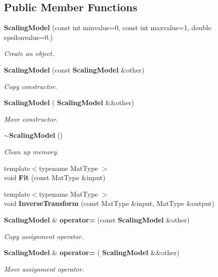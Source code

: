 \subsection*{Public Member Functions}
\begin{DoxyCompactItemize}
\item 
\textbf{ Scaling\+Model} (const int minvalue=0, const int maxvalue=1, double epsilonvalue=0.)
\begin{DoxyCompactList}\small\item\em Create an object. \end{DoxyCompactList}\item 
\textbf{ Scaling\+Model} (const \textbf{ Scaling\+Model} \&other)
\begin{DoxyCompactList}\small\item\em Copy constructor. \end{DoxyCompactList}\item 
\textbf{ Scaling\+Model} (\textbf{ Scaling\+Model} \&\&other)
\begin{DoxyCompactList}\small\item\em Move constructor. \end{DoxyCompactList}\item 
\textbf{ $\sim$\+Scaling\+Model} ()
\begin{DoxyCompactList}\small\item\em Clean up memory. \end{DoxyCompactList}\item 
{\footnotesize template$<$typename Mat\+Type $>$ }\\void \textbf{ Fit} (const Mat\+Type \&input)
\item 
{\footnotesize template$<$typename Mat\+Type $>$ }\\void \textbf{ Inverse\+Transform} (const Mat\+Type \&input, Mat\+Type \&output)
\item 
\textbf{ Scaling\+Model} \& \textbf{ operator=} (const \textbf{ Scaling\+Model} \&other)
\begin{DoxyCompactList}\small\item\em Copy assignment operator. \end{DoxyCompactList}\item 
\textbf{ Scaling\+Model} \& \textbf{ operator=} (\textbf{ Scaling\+Model} \&\&other)
\begin{DoxyCompactList}\small\item\em Move assignment operator. \end{DoxyCompactList}\item 

\end{DoxyCompactItemize}
